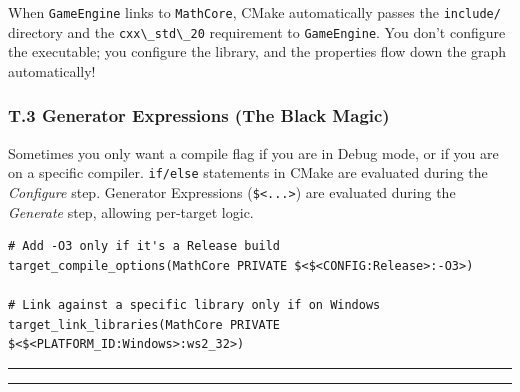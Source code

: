 When \passthrough{\lstinline!GameEngine!} links to
\passthrough{\lstinline!MathCore!}, CMake automatically passes the
\passthrough{\lstinline!include/!} directory and the
\passthrough{\lstinline!cxx\_std\_20!} requirement to
\passthrough{\lstinline!GameEngine!}. You don't configure the
executable; you configure the library, and the properties flow down the
graph automatically!

\hypertarget{t.3-generator-expressions-the-black-magic}{%
\subsubsection{T.3 Generator Expressions (The Black
Magic)}\label{t.3-generator-expressions-the-black-magic}}

Sometimes you only want a compile flag if you are in Debug mode, or if
you are on a specific compiler. \passthrough{\lstinline!if/else!}
statements in CMake are evaluated during the \emph{Configure} step.
Generator Expressions (\passthrough{\lstinline!$<...>!}) are evaluated
during the \emph{Generate} step, allowing per-target logic.

\begin{lstlisting}
# Add -O3 only if it's a Release build
target_compile_options(MathCore PRIVATE $<$<CONFIG:Release>:-O3>)

# Link against a specific library only if on Windows
target_link_libraries(MathCore PRIVATE $<$<PLATFORM_ID:Windows>:ws2_32>)
\end{lstlisting}

\begin{center}\rule{0.5\linewidth}{0.5pt}\end{center}

\begin{center}\rule{0.5\linewidth}{0.5pt}\end{center}
